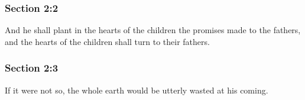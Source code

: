 
	\subsubsection{Section 2:2} %
		\label{DC2-2}

		And he shall plant in the hearts of the children the promises made to the fathers, and the hearts of the children shall turn to their fathers.


	\subsubsection{Section 2:3} %
		\label{DC2-3}

		If it were not so, the whole earth would be utterly wasted at his coming.

